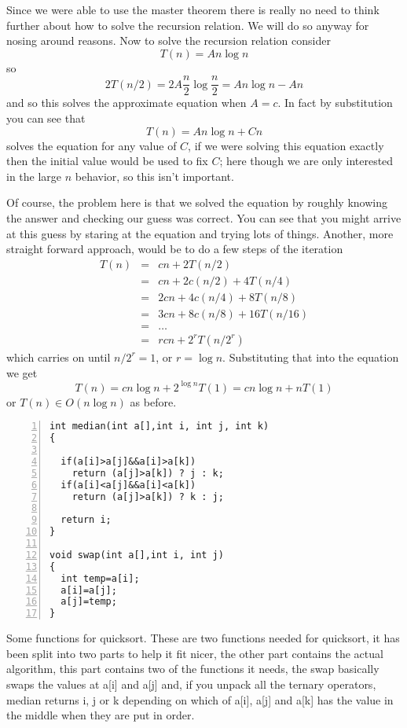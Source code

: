 \documentclass[11pt,a4paper]{scrartcl}
\begin{document}
Since we were able to use the master theorem there is really no need
to think further about how to solve the recursion relation. We will do
so anyway for nosing around reasons. Now to solve the recursion
relation consider
\begin{equation}
T(n)=An\log{n}
\end{equation}
so
\begin{equation}
2T(n/2)=2A\frac{n}{2}\log{\frac{n}{2}}=An\log{n}-An
\end{equation}
and so this solves the approximate equation when $A=c$. In fact by substitution you can see that
\begin{equation}
T(n)=An\log{n}+Cn
\end{equation}
solves the equation for any value of $C$, if we were solving this
equation exactly then the initial value would be used to fix $C$; here
though we are only interested in the large $n$ behavior, so this isn't
important.

Of course, the problem here is that we solved the equation by roughly
knowing the answer and checking our guess was correct. You can see
that you might arrive at this guess by staring at the equation and
trying lots of things. Another, more straight forward approach, would
be to do a few steps of the iteration
\begin{eqnarray}
T(n)&=&cn+2T(n/2)\\
    &=&cn+2c(n/2)+4T(n/4)\\
    &=&2cn+4c(n/4)+8T(n/8)\\
    &=&3cn+8c(n/8)+16T(n/16)\\
    &=&\ldots\\
    &=&rcn+2^rT(n/2^r)
\end{eqnarray}
which carries on until $n/2^r=1$, or $r=\log{n}$. Substituting that into the equation we get 
\begin{equation}
T(n)=cn\log{n}+2^{\log{n}}T(1)=cn\log{n}+nT(1)
\end{equation}
or $T(n)\in O(n\log{n})$ as before. 

\begin{table}
\begin{lstlisting}[numbers=left]
int median(int a[],int i, int j, int k)
{

  if(a[i]>a[j]&&a[i]>a[k])
    return (a[j]>a[k]) ? j : k;
  if(a[i]<a[j]&&a[i]<a[k])
    return (a[j]>a[k]) ? k : j;

  return i;
}

void swap(int a[],int i, int j)
{
  int temp=a[i];
  a[i]=a[j];
  a[j]=temp;
}
\end{lstlisting}
\caption{Some functions for quicksort. These are two functions needed
  for quicksort, it has been split into two parts to help it fit
  nicer, the other part contains the actual algorithm, this part
  contains two of the functions it needs, the swap basically swaps the
  values at a[i] and a[j] and, if you unpack all the ternary
  operators, median returns i, j or k depending on which of a[i], a[j]
  and a[k] has the value in the middle when they are put in
  order.\label{c_quick_extras}}
\end{table}
\end{document}

